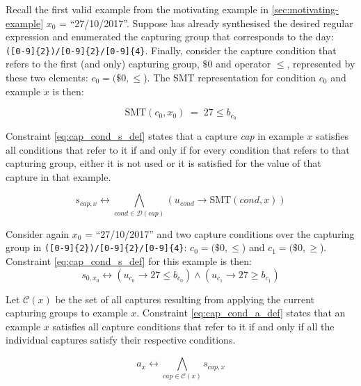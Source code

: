 \begin{example}
Recall the first valid example from the motivating example in \autoref{sec:motivating-example} \(x_0\) = ``27/10/2017''.
%
Suppose \Forest has already synthesised the desired regular expression and enumerated the capturing group that corresponds to the day: \verb`([0-9]{2})/[0-9]{2}/[0-9]{4}`. 
%
Finally, consider the capture condition that refers to the first (and only) capturing group, \(\$0\) and operator \(\le\), represented by these two elements: \(c_0 = (\$0, \le\)).
%
The SMT representation for condition \(c_0\) and example \(x\) is then:

\[\textrm{SMT}(c_0, x_0)\; =\;  27 \le b_{c_0}\]
\end{example}

Constraint \ref{eq:cap_cond_s_def} states that a capture \textit{cap} in example \(x\) satisfies all conditions that refer to it if and only if for every condition that refers to that capturing group, either it is not used or it is satisfied for the value of that capture in that example.

\begin{equation}\label{eq:cap_cond_s_def}
    s_{cap,x} \leftrightarrow \bigwedge_{cond \in \mathcal{D}(cap)} (u_{cond} \rightarrow \textrm{SMT}(\textit{cond}, x))
\end{equation}

\begin{example}
Consider again \(x_0\) = ``27/10/2017'' and two capture conditions over the capturing group in \verb`([0-9]{2})/[0-9]{2}/[0-9]{4}`: \(c_0 = (\$0, \le\)) and \(c_1 = (\$0, \ge\)). Constraint \eqref{eq:cap_cond_s_def} for this example is then:
%
\begin{equation*}
    s_{0,x_0} \leftrightarrow (u_{c_0} \rightarrow 27 \le b_{c_0}) 
    \land (u_{c_1} \rightarrow 27 \ge b_{c_1})
\end{equation*}

\end{example}

Let \(\mathcal{C}(x)\) be the set of all captures resulting from applying the current capturing groups to example \(x\). Constraint \ref{eq:cap_cond_a_def} states that an example \(x\) satisfies all capture conditions that refer to it if and only if all the individual captures satisfy their respective conditions.

\begin{equation}\label{eq:cap_cond_a_def}
    a_x \leftrightarrow \bigwedge_{cap \in \mathcal{C}(x)} s_{cap,x}
\end{equation}


